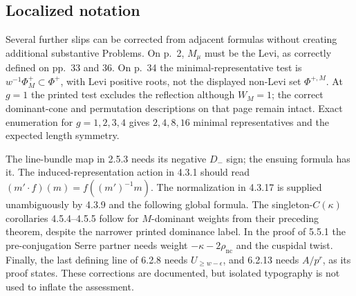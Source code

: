 \documentclass[10pt]{article}
\begin{document}
\subsection*{Localized notation}
Several further slips can be corrected from adjacent formulas without creating additional substantive Problems. On p. 2, \(M_\mu\) must be the Levi, as correctly defined on pp. 33 and 36. On p. 34 the minimal-representative test is \(w^{-1}\Phi_M^+\subset\Phi^+\), with Levi positive roots, not the displayed non-Levi set \(\Phi^{+,M}\). At \(g=1\) the printed test excludes the reflection although \(W_M=1\); the correct dominant-cone and permutation descriptions on that page remain intact. Exact enumeration for \(g=1,2,3,4\) gives \(2,4,8,16\) minimal representatives and the expected length symmetry.\par
The line-bundle map in 2.5.3 needs its negative \(D_-\) sign; the ensuing formula has it. The induced-representation action in 4.3.1 should read \((m'\cdot f)(m)=f((m')^{-1}m)\). The normalization in 4.3.17 is supplied unambiguously by 4.3.9 and the following global formula. The singleton-\(C(\kappa)\) corollaries 4.5.4–4.5.5 follow for \(M\)-dominant weights from their preceding theorem, despite the narrower printed dominance label. In the proof of 5.5.1 the pre-conjugation Serre partner needs weight \(-\kappa-2\rho_{\mathrm{nc}}\) and the cuspidal twist. Finally, the last defining line of 6.2.8 needs \(U_{\geq w-\epsilon}\), and 6.2.13 needs \(A/p^r\), as its proof states. These corrections are documented, but isolated typography is not used to inflate the assessment.\par
\end{document}
